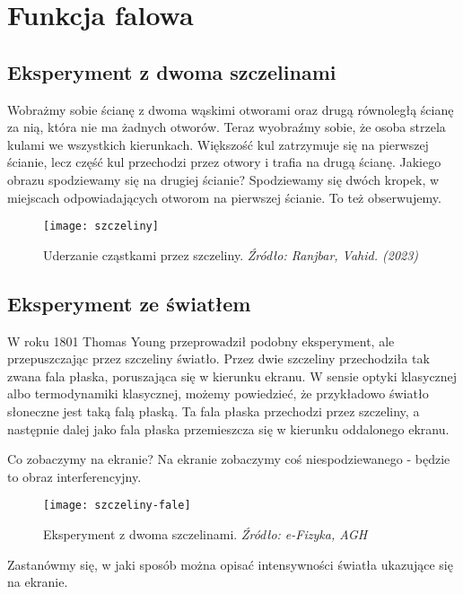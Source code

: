 \section{Funkcja falowa}

\subsection{Eksperyment z dwoma szczelinami}

Wobrażmy sobie ścianę z dwoma wąskimi otworami oraz drugą równoległą ścianę za nią, która nie ma żadnych otworów.
Teraz wyobraźmy sobie, że osoba strzela kulami we wszystkich kierunkach. Większość kul zatrzymuje się na pierwszej ścianie,
lecz część kul przechodzi przez otwory i trafia na drugą ścianę.
Jakiego obrazu spodziewamy się na drugiej ścianie? Spodziewamy się dwóch kropek, w miejscach odpowiadających otworom na pierwszej ścianie. To też obserwujemy.

\begin{figure}[H]
    \centering
    \texttt{[image: szczeliny]}
    \caption{Uderzanie cząstkami przez szczeliny. \textit{Źródło: Ranjbar, Vahid. (2023)}}
    \label{fig:szczeliny}
\end{figure}

\subsection{Eksperyment ze światłem}
W roku 1801 Thomas Young przeprowadził podobny eksperyment, ale przepuszczając przez szczeliny światło.
Przez dwie szczeliny przechodziła tak zwana fala płaska, poruszająca się w kierunku ekranu.
W sensie optyki klasycznej albo termodynamiki klasycznej, możemy powiedzieć, że przykładowo światło słoneczne jest taką falą płaską.
Ta fala płaska przechodzi przez szczeliny, a następnie dalej jako fala płaska przemieszcza się w kierunku oddalonego ekranu.

Co zobaczymy na ekranie? Na ekranie zobaczymy coś niespodziewanego - będzie to obraz interferencyjny.
\begin{figure}[H]
    \centering
    \texttt{[image: szczeliny-fale]}
    \caption{Eksperyment z dwoma szczelinami. \textit{Źródło: e-Fizyka, AGH}}
    \label{fig:szczeliny-fale}
\end{figure}

Zastanówmy się, w jaki sposób można opisać intensywności światła ukazujące się na ekranie.

